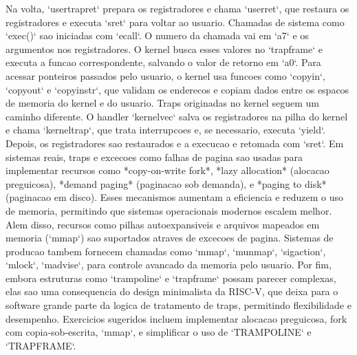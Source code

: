 Na volta, `usertrapret` prepara os registradores e chama `userret`, que restaura os registradores e executa
`sret` para voltar ao usuario.
Chamadas de sistema como `exec()` sao iniciadas com `ecall`. O numero da chamada vai em `a7` e os
argumentos nos registradores. O kernel busca esses valores no `trapframe` e executa a funcao
correspondente, salvando o valor de retorno em `a0`.
Para acessar ponteiros passados pelo usuario, o kernel usa funcoes como `copyin`, `copyout` e `copyinstr`,
que validam os enderecos e copiam dados entre os espacos de memoria do kernel e do usuario.
Traps originadas no kernel seguem um caminho diferente. O handler `kernelvec` salva os registradores na
pilha do kernel e chama `kerneltrap`, que trata interrupcoes e, se necessario, executa `yield`. Depois, os
registradores sao restaurados e a execucao e retomada com `sret`.
Em sistemas reais, traps e excecoes como falhas de pagina sao usadas para implementar recursos como
*copy-on-write fork*, *lazy allocation* (alocacao preguicosa), *demand paging* (paginacao sob demanda), e
*paging to disk* (paginacao em disco). Esses mecanismos aumentam a eficiencia e reduzem o uso de
memoria, permitindo que sistemas operacionais modernos escalem melhor.
Alem disso, recursos como pilhas autoexpansiveis e arquivos mapeados em memoria (`mmap`) sao
suportados atraves de excecoes de pagina. Sistemas de producao tambem fornecem chamadas como
`mmap`, `munmap`, `sigaction`, `mlock`, `madvise`, para controle avancado da memoria pelo usuario.
Por fim, embora estruturas como `trampoline` e `trapframe` possam parecer complexas, elas sao uma
consequencia do design minimalista da RISC-V, que deixa para o software grande parte da logica de
tratamento de traps, permitindo flexibilidade e desempenho.
Exercicios sugeridos incluem implementar alocacao preguicosa, fork com copia-sob-escrita, `mmap`, e
simplificar o uso de `TRAMPOLINE` e `TRAPFRAME`.
